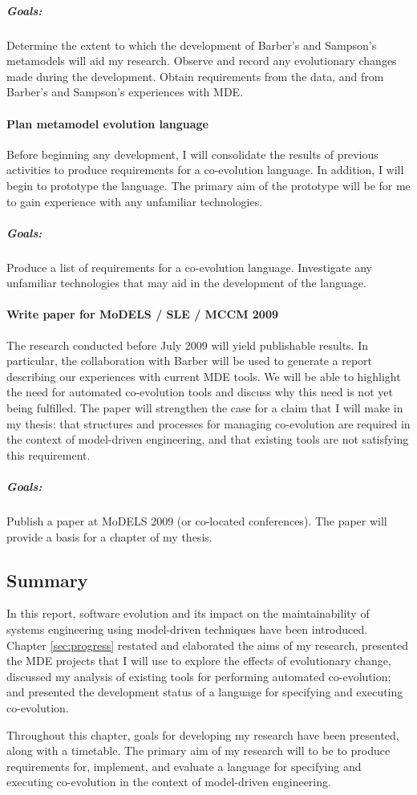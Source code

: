 \subparagraph{Goals:} Determine the extent to which the development of Barber's and Sampson's metamodels will aid my research. Observe and record any evolutionary changes made during the development. Obtain requirements from the data, and from Barber's and Sampson's experiences with MDE.



\paragraph{Plan metamodel evolution language} %
\label{par:plan_metamodel_evolution_language}
Before beginning any development, I will consolidate the results of previous activities to produce requirements for a co-evolution language. In addition, I will begin to prototype the language. The primary aim of the prototype will be for me to gain experience with any unfamiliar technologies.

\subparagraph{Goals:} Produce a list of requirements for a co-evolution language. Investigate any unfamiliar technologies that may aid in the development of the language.



\paragraph{Write paper for MoDELS / SLE / MCCM 2009} %
\label{par:write_paper_for_models_sle_mccm_2009}
The research conducted before July 2009 will yield publishable results. In particular, the collaboration with Barber will be used to generate a report describing our experiences with current MDE tools. We will be able to highlight the need for automated co-evolution tools and discuss why this need is not yet being fulfilled. The paper will strengthen the case for a claim that I will make in my thesis: that structures and processes for managing co-evolution are required in the context of model-driven engineering, and that existing tools are not satisfying this requirement.

\subparagraph{Goals:} Publish a paper at MoDELS 2009 (or co-located conferences). The paper will provide a basis for a chapter of my thesis.


\subsection{Summary}
In this report, software evolution and its impact on the maintainability of systems engineering using model-driven techniques have been introduced. Chapter \ref{sec:progress} restated and elaborated the aims of my research, presented the MDE projects that I will use to explore the effects of evolutionary change, discussed my analysis of existing tools for performing automated co-evolution; and presented the development status of a language for specifying and executing co-evolution.

Throughout this chapter, goals for developing my research have been presented, along with a timetable. The primary aim of my research will to be to produce requirements for, implement, and evaluate a language for specifying and executing co-evolution in the context of model-driven engineering.